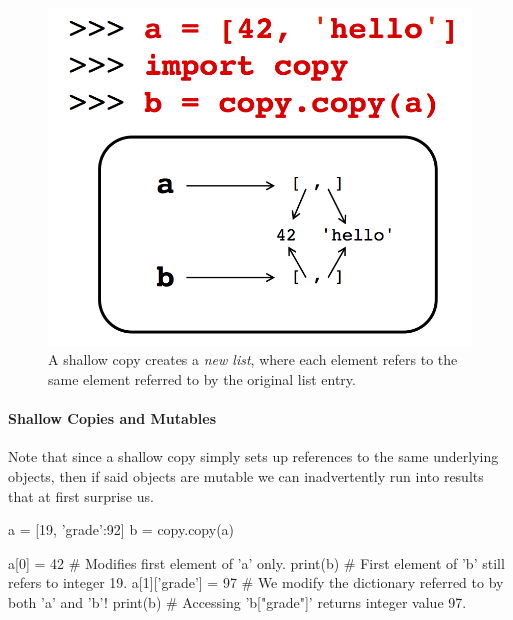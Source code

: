 \documentclass[12pt,letterpaper,twoside]{article}
\begin{document}
\begin{figure}[h]
\centering
\includegraphics[scale=0.35]{fig/shallow-copy.png}
\caption{\small A shallow copy creates a \emph{new list}, where each element refers to the same
  element referred to by the original list entry.}
\end{figure}

\paragraph{Shallow Copies and Mutables} Note that since a shallow copy simply sets up references
to the same underlying objects, then if said objects are mutable we can inadvertently run into
results that at first surprise us.
\begin{python}
a = [19, {'grade':92}]
b = copy.copy(a)

a[0] = 42           # Modifies first element of 'a' only.
print(b)            # First element of 'b' still refers to integer 19.
a[1]['grade'] = 97  # We modify the dictionary referred to by both 'a' and 'b'!
print(b)            # Accessing 'b["grade"]' returns integer value 97.
\end{python}
\end{document}

